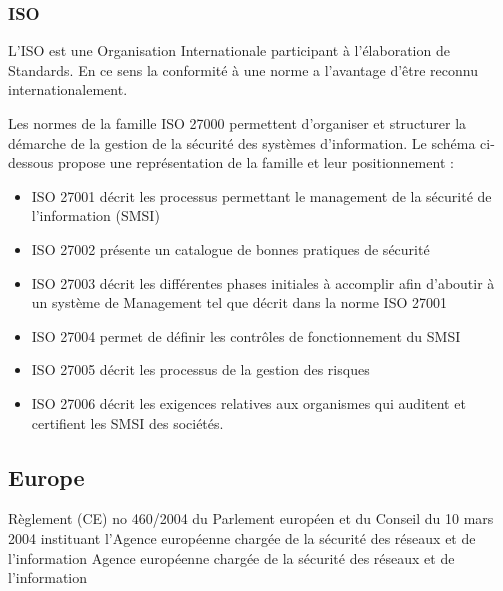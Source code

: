 \subsubsection{ISO}


L’ISO est une Organisation Internationale participant à l’élaboration de Standards. En ce sens la conformité à une norme a l’avantage d’être reconnu internationalement.
 
Les normes de la famille ISO 27000 permettent d’organiser et structurer la démarche de la gestion de la sécurité des systèmes d’information. Le schéma ci-dessous propose une représentation de la famille et leur positionnement : 



\begin{itemize}
  \item ISO 27001 décrit les processus permettant le management de la sécurité de l’information (SMSI)
  \item ISO 27002 présente un catalogue de bonnes pratiques de sécurité
  \item ISO 27003 décrit les différentes phases initiales à accomplir afin d’aboutir à un système de Management tel que décrit dans la norme ISO 27001
  \item ISO 27004 permet de définir les contrôles de fonctionnement du SMSI
  \item ISO 27005 décrit les processus de la gestion des risques
  \item ISO 27006 décrit les exigences relatives aux organismes qui auditent et certifient les SMSI des sociétés.
\end{itemize}


\subsection{Europe}

Règlement (CE) no 460/2004 du Parlement européen et du Conseil
du 10 mars 2004
instituant l'Agence européenne chargée de la sécurité des réseaux et de l'information
Agence européenne chargée de la sécurité des réseaux et de l'information

